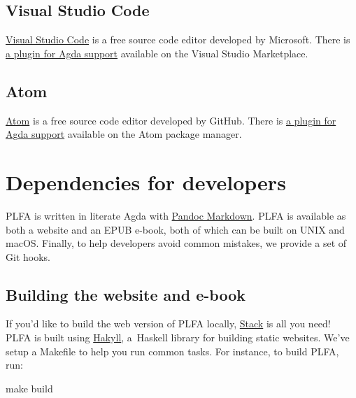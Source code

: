 \hypertarget{visual-studio-code}{%
\subsection{Visual Studio Code}\label{visual-studio-code}}

\href{https://code.visualstudio.com/}{Visual Studio Code} is a free
source code editor developed by Microsoft. There is
\href{https://marketplace.visualstudio.com/items?itemName=banacorn.agda-mode}{a
plugin for Agda support} available on the Visual Studio Marketplace.

\hypertarget{atom}{%
\subsection{Atom}\label{atom}}

\href{https://atom.io/}{Atom} is a free source code editor developed by
GitHub. There is \href{https://atom.io/packages/agda-mode}{a plugin for
Agda support} available on the Atom package manager.

\hypertarget{dependencies-for-developers}{%
\section{Dependencies for
developers}\label{dependencies-for-developers}}

PLFA is written in literate Agda with
\href{https://pandoc.org/MANUAL.html\#pandocs-markdown}{Pandoc
Markdown}. PLFA is available as both a website and an EPUB e-book, both
of which can be built on UNIX and macOS. Finally, to help developers
avoid common mistakes, we provide a set of Git hooks.

\hypertarget{building-the-website-and-e-book}{%
\subsection{Building the website and
e-book}\label{building-the-website-and-e-book}}

If you'd like to build the web version of PLFA locally,
\protect\hyperlink{install-the-haskell-tool-stack}{Stack} is all you
need! PLFA is built using \href{https://jaspervdj.be/hakyll/}{Hakyll},
a~Haskell library for building static websites. We've setup a Makefile
to help you run common tasks. For instance, to build PLFA, run:

\begin{myDisplay}
make build
\end{myDisplay}


